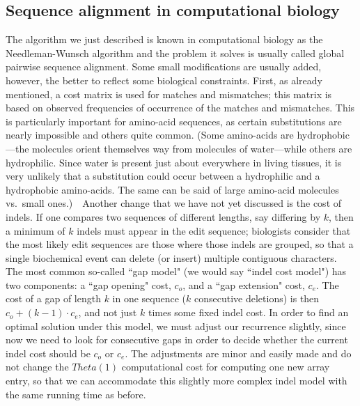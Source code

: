 \documentclass[11pt]{article}
\begin{document}
\subsection{Sequence alignment in computational biology}
The algorithm we just described is known in computational biology
as the Needleman-Wunsch algorithm and the problem it solves is usually
called global pairwise sequence alignment.  Some small modifications
are usually added, however, the better to reflect some biological constraints.
First, as already mentioned, a cost matrix is used for matches and
mismatches; this matrix is based on observed frequencies of occurrence of
the matches and mismatches.  This is particularly important for amino-acid
sequences, as certain substitutions are nearly impossible and others quite
common.  (Some amino-acids are hydrophobic---the molecules orient themselves
way from molecules of water---while others are hydrophilic.  Since water
is present just about everywhere in living tissues, it is very unlikely
that a substitution could occur between a hydrophilic and a hydrophobic
amino-acids.  The same can be said of large amino-acid molecules vs.\ small
ones.)\ \ Another change that we have not yet discussed is the cost of
indels.  If one compares two sequences of different lengths,
say differing by $k$, then a minimum of $k$ indels must appear in
the edit sequence; biologists consider that the most likely edit sequences
are those where those indels are grouped, so that a single biochemical
event can delete (or insert) multiple contiguous characters.
The most common so-called ``gap model" (we would say ``indel cost model")
has two components: a ``gap opening" cost, $c_o$, and a ``gap extension"
cost, $c_e$.  The cost of a gap of length $k$ in one sequence ($k$ consecutive
deletions) is then $c_o + (k-1)\cdot c_e$, and not just $k$ times some
fixed indel cost.  In order to find an optimal solution under this model,
we must adjust our recurrence slightly, since now we need to look for
consecutive gaps in order to decide whether the current indel cost should
be $c_o$ or $c_e$.  The adjustments are minor and easily made and do not
change the $Theta(1)$ computational cost for computing one new array entry,
so that we can accommodate this slightly more complex indel model with the
same running time as before.
\end{document}
